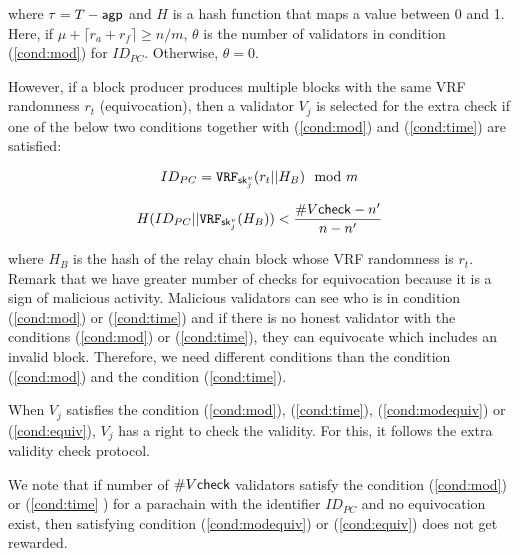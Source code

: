 \begin{enumerate}
      where $\tau = T- \mathsf{agp}$ and $H$ is a hash function that maps a value between 0 and 1. Here, if $\mu + \lceil r_a + r_f \rceil \geq n/m$, $\theta$ is the number of validators in condition (\ref{cond:mod}) for $ID_{PC}$. Otherwise, $\theta = 0$.
    
    However, if a block producer produces multiple blocks with the same VRF randomness $r_t$ (equivocation), then a validator $V_j$ is selected for the extra check if one of the  below two conditions together with (\ref{cond:mod}) and (\ref{cond:time}) are satisfied:
    
    
    \begin{equation}\label{cond:modequiv}
         ID_{PC} = \mathtt{VRF}_{\mathsf{sk}^v_{j}}(r_{t}||H_B) \mod m
    \end{equation}
    
    \begin{equation}\label{cond:equiv}
         H(ID_{PC} || \mathtt{VRF}_{\mathsf{sk}^v_j}(H_{B})) < \frac{\#V\mathsf{check} - n'}{n-n'}   
    \end{equation}
    
     where $H_B$ is the hash of the relay chain block whose VRF randomness is $r_t$. Remark that we have greater number of checks for equivocation because it is a sign of malicious activity. Malicious validators can see who is in condition (\ref{cond:mod}) or (\ref{cond:time}) and if there is  no honest validator with the conditions (\ref{cond:mod}) or (\ref{cond:time}), they can equivocate which includes an invalid block. Therefore, we need different conditions than the condition (\ref{cond:mod}) and the condition (\ref{cond:time}).
    
    When $V_j$ satisfies the condition (\ref{cond:mod}), (\ref{cond:time}), (\ref{cond:modequiv}) or (\ref{cond:equiv}), $V_j$ has a right to check the validity. For this, it follows the extra validity check protocol.
    
    We note that if number of $\#V\mathsf{check}$ validators satisfy the condition (\ref{cond:mod}) or (\ref{cond:time} ) for a parachain with the identifier $ID_{PC}$ and no equivocation exist, then satisfying condition (\ref{cond:modequiv}) or (\ref{cond:equiv}) does not get rewarded.
    
\end{enumerate}


